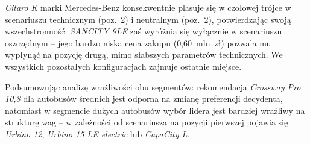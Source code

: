 \textit{Citaro K} marki Mercedes-Benz konsekwentnie plasuje się w czołowej trójce w scenariuszu technicznym (poz.~2) i neutralnym (poz.~2), potwierdzając swoją wszechstronność. \textit{SANCITY 9LE} zaś wyróżnia się wyłącznie w scenariuszu oszczędnym -- jego bardzo niska cena zakupu (0,60~mln~zł) pozwala mu wypłynąć na pozycję drugą, mimo słabszych parametrów technicznych. We wszystkich pozostałych konfiguracjach zajmuje ostatnie miejsce.

Podsumowując analizę wrażliwości obu segmentów: rekomendacja \textit{Crossway Pro 10,8} dla autobusów średnich jest odporna na zmianę preferencji decydenta, natomiast w segmencie dużych autobusów wybór lidera jest bardziej wrażliwy na strukturę wag -- w zależności od scenariusza na pozycji pierwszej pojawia się \textit{Urbino 12}, \textit{Urbino 15 LE electric} lub \textit{CapaCity L}.
